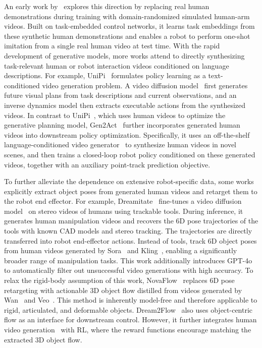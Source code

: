 \documentclass[Afour,sageh,times]{sagej}
\begin{document}
An early work by~\cite{bonardi2020learning} explores this direction by replacing real human demonstrations during training with domain-randomized simulated human-arm videos. Built on task-embedded control networks, it learns task embeddings from these synthetic human demonstrations and enables a robot to perform one-shot imitation from a single real human video at test time. With the rapid development of generative models, more works attend to directly synthesizing task-relevant human or robot interaction videos conditioned on language descriptions. For example, UniPi~\citep{du2023learning} formulates policy learning as a text-conditioned video generation problem. A video diffusion model~\citep{ho2022imagen} first generates future visual plans from task descriptions and current observations, and an inverse dynamics model then extracts executable actions from the synthesized videos. In contrast to UniPi~\citep{du2023learning}, which uses human videos to optimize the generative planning model, Gen2Act~\citep{bharadhwaj2024gen2act} further incorporates generated human videos into downstream policy optimization. Specifically, it uses an off-the-shelf language-conditioned video generator~\citep{kondratyuk2023videopoet} to synthesize human videos in novel scenes, and then trains a closed-loop robot policy conditioned on these generated videos, together with an auxiliary point-track prediction objective. 

To further alleviate the dependence on extensive robot-specific data, some works explicitly extract object poses from generated human videos and retarget them to the robot end effector. For example, Dreamitate~\citep{liang2024dreamitate} fine-tunes a video diffusion model~\citep{van2024generative} on stereo videos of humans using trackable tools. During inference, it generates human manipulation videos and recovers the 6D pose trajectories of the tools with known CAD models and stereo tracking. The trajectories are directly transferred into robot end-effector actions. Instead of tools, \cite{patel2025robotic} track 6D object poses from human videos generated by Sora~\citep{brooks2024video} and Kling~\citep{KlingAI2024}, enabling a significantly broader range of manipulation tasks. This work additionally introduces GPT-4o~\citep{achiam2023gpt} to automatically filter out unsuccessful video generations with high accuracy. To relax the rigid-body assumption of this work, NovaFlow~\citep{li2025novaflow} replaces 6D pose retargeting with actionable 3D object flow distilled from videos generated by Wan~\citep{wan2025wan} and Veo~\cite{wiedemer2025video}. This method is inherently model-free and therefore applicable to rigid, articulated, and deformable objects. Dream2Flow~\citep{dharmarajan2025dream2flow} also uses object-centric flow as an interface for downstream control. However, it further integrates human video generation~\citep{wan2025wan} with RL, where the reward functions encourage matching the extracted 3D object flow.
\end{document}
